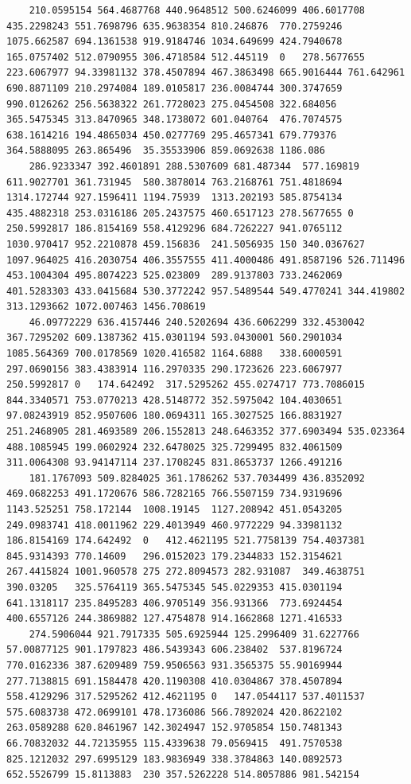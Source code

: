 \documentclass[UTF8]{ctexart}
\begin{document}
\begin{lstlisting}
	210.0595154	564.4687768	440.9648512	500.6246099	406.6017708	435.2298243	551.7698796	635.9638354	810.246876	770.2759246	1075.662587	694.1361538	919.9184746	1034.649699	424.7940678	165.0757402	512.0790955	306.4718584	512.445119	0	278.5677655	223.6067977	94.33981132	378.4507894	467.3863498	665.9016444	761.642961	690.8871109	210.2974084	189.0105817	236.0084744	300.3747659	990.0126262	256.5638322	261.7728023	275.0454508	322.684056	365.5475345	313.8470965	348.1738072	601.040764	476.7074575	638.1614216	194.4865034	450.0277769	295.4657341	679.779376	364.5888095	263.865496	35.35533906	859.0692638	1186.086
	286.9233347	392.4601891	288.5307609	681.487344	577.169819	611.9027701	361.731945	580.3878014	763.2168761	751.4818694	1314.172744	927.1596411	1194.75939	1313.202193	585.8754134	435.4882318	253.0316186	205.2437575	460.6517123	278.5677655	0	250.5992817	186.8154169	558.4129296	684.7262227	941.0765112	1030.970417	952.2210878	459.156836	241.5056935	150	340.0367627	1097.964025	416.2030754	406.3557555	411.4000486	491.8587196	526.711496	453.1004304	495.8074223	525.023809	289.9137803	733.2462069	401.5283303	433.0415684	530.3772242	957.5489544	549.4770241	344.419802	313.1293662	1072.007463	1456.708619
	46.09772229	636.4157446	240.5202694	436.6062299	332.4530042	367.7295202	609.1387362	415.0301194	593.0430001	560.2901034	1085.564369	700.0178569	1020.416582	1164.6888	338.6000591	297.0690156	383.4383914	116.2970335	290.1723626	223.6067977	250.5992817	0	174.642492	317.5295262	455.0274717	773.7086015	844.3340571	753.0770213	428.5148772	352.5975042	104.4030651	97.08243919	852.9507606	180.0694311	165.3027525	166.8831927	251.2468905	281.4693589	206.1552813	248.6463352	377.6903494	535.023364	488.1085945	199.0602924	232.6478025	325.7299495	832.4061509	311.0064308	93.94147114	237.1708245	831.8653737	1266.491216
	181.1767093	509.8284025	361.1786262	537.7034499	436.8352092	469.0682253	491.1720676	586.7282165	766.5507159	734.9319696	1143.525251	758.172144	1008.19145	1127.208942	451.0543205	249.0983741	418.0011962	229.4013949	460.9772229	94.33981132	186.8154169	174.642492	0	412.4621195	521.7758139	754.4037381	845.9314393	770.14609	296.0152023	179.2344833	152.3154621	267.4415824	1001.960578	275	272.8094573	282.931087	349.4638751	390.03205	325.5764119	365.5475345	545.0229353	415.0301194	641.1318117	235.8495283	406.9705149	356.931366	773.6924454	400.6557126	244.3869882	127.4754878	914.1662868	1271.416533
	274.5906044	921.7917335	505.6925944	125.2996409	31.6227766	57.00877125	901.1797823	486.5439343	606.238402	537.8196724	770.0162336	387.6209489	759.9506563	931.3565375	55.90169944	277.7138815	691.1584478	420.1190308	410.0304867	378.4507894	558.4129296	317.5295262	412.4621195	0	147.0544117	537.4011537	575.6083738	472.0699101	478.1736086	566.7892024	420.8622102	263.0589288	620.8461967	142.3024947	152.9705854	150.7481343	66.70832032	44.72135955	115.4339638	79.0569415	491.7570538	825.1212032	297.6995129	183.9836949	338.3784863	140.0892573	652.5526799	15.8113883	230	357.5262228	514.8057886	981.542154

\end{lstlisting}
\end{document}
